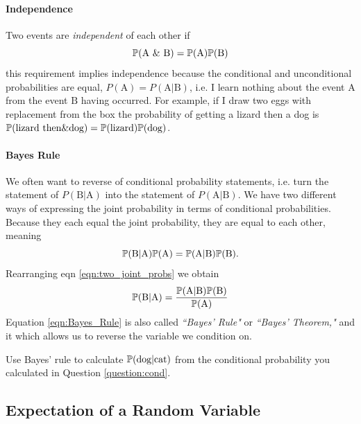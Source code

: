 \paragraph{Independence}
Two events are \emph{independent} of each other if
\begin{equation}
\P(\textrm{A \& B}) = \P(\textrm{A}) \P(\textrm{B}) \label{eqn:basic_indie}
\end{equation}
this requirement implies independence because the conditional and
unconditional probabilities are equal, $P(\textrm{A}) = P(\textrm{A} | \textrm{B})$, i.e. I learn
nothing about the event $\textrm{A}$ from the event $\textrm{B}$ having occurred. 
For example, if I draw two eggs with replacement from the box the
probability of getting a lizard then a dog is $\P(\textrm{lizard then} \& \textrm{dog}) =
\P(\textrm{lizard}) \P(\textrm{dog})$. 


\paragraph{Bayes Rule}
We often want to reverse of conditional probability statements,
i.e. turn the statement of $P(\textrm{B} | \textrm{A})$ into the statement of $P(\textrm{A} |
\textrm{B})$. 
We have two different ways of expressing the joint probability in terms of conditional probabilities. Because they each equal the joint probability, they are equal to each other, meaning
\begin{equation}
\P(\textrm{B} | \textrm{A}) \P(\textrm{A}) =  \P(\textrm{A} | \textrm{B}) \P(\textrm{B}) . \label{eqn:two_joint_probs}
 \end{equation}
Rearranging eqn \eqref{eqn:two_joint_probs} we obtain 
\begin{equation}
\P(\textrm{B} | \textrm{A}) =  \frac{\P(\textrm{A} | \textrm{B}) \P(\textrm{B}) }{\P(\textrm{A})} \label{eqn:Bayes_Rule}
 \end{equation}
Equation \eqref{eqn:Bayes_Rule} is also called \emph{``Bayes' Rule"} or \emph{``Bayes' Theorem,"} and it  which allows us to reverse the variable we
condition on. 
\begin{question}
Use Bayes' rule to calculate $\P(\textrm{dog} | \textrm{cat})$ from
the conditional probability you calculated in Question
\ref{question:cond}.\\
 \end{question}


\subsection{Expectation of a Random Variable}\label{appendix:expectation}

